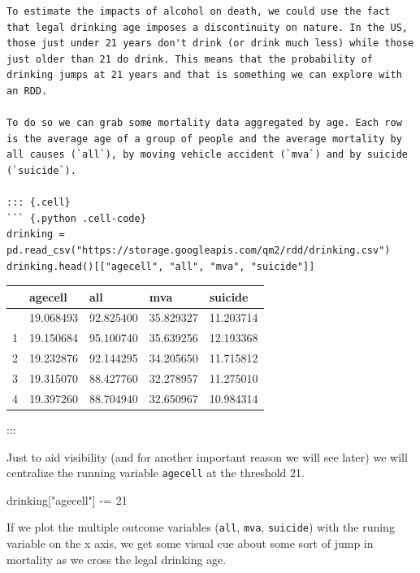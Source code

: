 \documentclass[
  letterpaper,
  DIV=11,
  numbers=noendperiod]{scrreprt}
\newenvironment{Shaded}{\begin{snugshade}}{\end{snugshade}}
\newcommand{\DecValTok}[1]{\textcolor[rgb]{0.68,0.00,0.00}{#1}}
\newcommand{\NormalTok}[1]{\textcolor[rgb]{0.00,0.23,0.31}{#1}}
\newcommand{\OperatorTok}[1]{\textcolor[rgb]{0.37,0.37,0.37}{#1}}
\newcommand{\StringTok}[1]{\textcolor[rgb]{0.13,0.47,0.30}{#1}}
\begin{document}
\begin{verbatim}
To estimate the impacts of alcohol on death, we could use the fact that legal drinking age imposes a discontinuity on nature. In the US, those just under 21 years don't drink (or drink much less) while those just older than 21 do drink. This means that the probability of drinking jumps at 21 years and that is something we can explore with an RDD.

To do so we can grab some mortality data aggregated by age. Each row is the average age of a group of people and the average mortality by all causes (`all`), by moving vehicle accident (`mva`) and by suicide (`suicide`). 

::: {.cell}
``` {.python .cell-code}
drinking = pd.read_csv("https://storage.googleapis.com/qm2/rdd/drinking.csv")
drinking.head()[["agecell", "all", "mva", "suicide"]]
\end{verbatim}

\begin{longtable}[]{@{}lllll@{}}
\toprule\noalign{}
& agecell & all & mva & suicide \\
\midrule\noalign{}
\endhead
\bottomrule\noalign{}
\endlastfoot
0 & 19.068493 & 92.825400 & 35.829327 & 11.203714 \\
1 & 19.150684 & 95.100740 & 35.639256 & 12.193368 \\
2 & 19.232876 & 92.144295 & 34.205650 & 11.715812 \\
3 & 19.315070 & 88.427760 & 32.278957 & 11.275010 \\
4 & 19.397260 & 88.704940 & 32.650967 & 10.984314 \\
\end{longtable}

:::

Just to aid visibility (and for another important reason we will see
later) we will centralize the running variable \texttt{agecell} at the
threshold 21.

\begin{Shaded}
\begin{Highlighting}[]
\NormalTok{drinking[}\StringTok{"agecell"}\NormalTok{] }\OperatorTok{{-}=} \DecValTok{21}
\end{Highlighting}
\end{Shaded}

If we plot the multiple outcome variables (\texttt{all}, \texttt{mva},
\texttt{suicide}) with the runing variable on the x axis, we get some
visual cue about some sort of jump in mortality as we cross the legal
drinking age.
\end{document}
